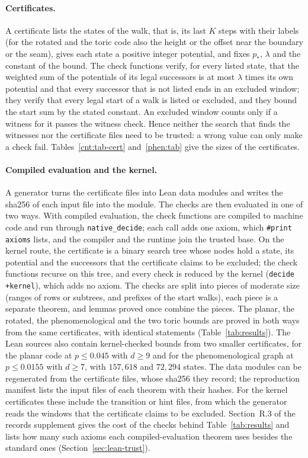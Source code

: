 \documentclass[11pt]{amsart}
\theoremstyle{definition}
\theoremstyle{remark}
\numberwithin{equation}{section}
\begin{document}
\paragraph{Certificates.}
A certificate lists the states of the walk, that is, its last $K$ steps with their labels (for the rotated and the toric code also the height or the offset near the boundary or the seam), gives each state a positive integer potential, and fixes $p_\ast$, $\lambda$ and the constant of the bound.
The check functions verify, for every listed state, that the weighted sum of the potentials of its legal successors is at most $\lambda$ times its own potential and that every successor that is not listed ends in an excluded window; they verify that every legal start of a walk is listed or excluded, and they bound the start sum by the stated constant.
An excluded window counts only if a witness for it passes the witness check. Hence neither the search that finds the witnesses nor the certificate files need to be trusted: a wrong value can only make a check fail.
Tables~\ref{cnt:tab-cert} and~\ref{phen:tab} give the sizes of the certificates.

\paragraph{Compiled evaluation and the kernel.}
A generator turns the certificate files into Lean data modules and writes the sha256 of each input file into the module.
The checks are then evaluated in one of two ways.
With compiled evaluation, the check functions are compiled to machine code and run through \texttt{native\_decide}; each call adds one axiom, which \texttt{\#print axioms} lists, and the compiler and the runtime join the trusted base.
On the kernel route, the certificate is a binary search tree whose nodes hold a state, its potential and the successors that the certificate claims to be excluded; the check functions recurse on this tree, and every check is reduced by the kernel (\texttt{decide +kernel}), which adds no axiom.
The checks are split into pieces of moderate size (ranges of rows or subtrees, and prefixes of the start walks), each piece is a separate theorem, and lemmas proved once combine the pieces.
The planar, the rotated, the phenomenological and the two toric bounds are proved in both ways from the same certificates, with identical statements (Table~\ref{tab:results}).
The Lean sources also contain kernel-checked bounds from two smaller certificates, for the planar code at $p\le0.045$ with $d\ge9$ and for the phenomenological graph at $p\le0.0155$ with $d\ge7$, with $157{,}618$ and $72{,}294$ states.
The data modules can be regenerated from the certificate files, whose sha256 they record; the reproduction manifest lists the input files of each theorem with their hashes.
For the kernel certificates these include the transition or hint files, from which the generator reads the windows that the certificate claims to be excluded.
Section~R.3 of the records supplement gives the cost of the checks behind Table~\ref{tab:results} and lists how many such axioms each compiled-evaluation theorem uses besides the standard ones (Section~\ref{sec:lean-trust}).
\end{document}
